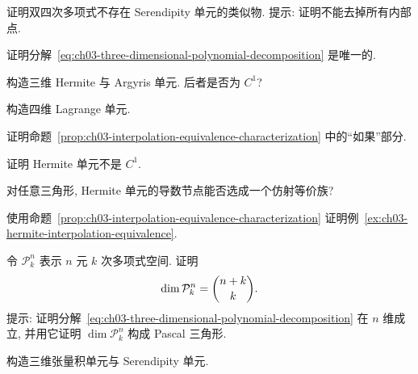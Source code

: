\begin{MBExercise}
\label{exr:ch03-22}
证明双四次多项式不存在 Serendipity 单元的类似物. 提示: 证明不能去掉所有内部点.
\end{MBExercise}

\begin{MBExercise}
\label{exr:ch03-23}
证明分解~\eqref{eq:ch03-three-dimensional-polynomial-decomposition} 是唯一的.
\end{MBExercise}

\begin{MBExercise}
\label{exr:ch03-24}
构造三维 Hermite 与 Argyris 单元. 后者是否为 $C^1$?
\end{MBExercise}

\begin{MBExercise}
\label{exr:ch03-25}
构造四维 Lagrange 单元.
\end{MBExercise}

\begin{MBExercise}
\label{exr:ch03-26}
证明命题~\ref{prop:ch03-interpolation-equivalence-characterization} 中的``如果''部分.
\end{MBExercise}

\begin{MBExercise}
\label{exr:ch03-27}
证明 Hermite 单元不是 $C^1$.
\end{MBExercise}

\begin{MBExercise}
\label{exr:ch03-28}
对任意三角形, Hermite 单元的导数节点能否选成一个仿射等价族?
\end{MBExercise}

\begin{MBExercise}
\label{exr:ch03-29}
使用命题~\ref{prop:ch03-interpolation-equivalence-characterization} 证明例~\ref{ex:ch03-hermite-interpolation-equivalence}.
\end{MBExercise}

\begin{MBExercise}
\label{exr:ch03-30}
令 $\mathcal P_k^n$ 表示 $n$ 元 $k$ 次多项式空间. 证明
\[
\MathBookFormulaID{formula-ch03-exercise-30-polynomial-dimension}
\dim\mathcal P_k^n=\binom{n+k}{k}.
\]
提示: 证明分解~\eqref{eq:ch03-three-dimensional-polynomial-decomposition} 在 $n$ 维成立, 并用它证明 $\dim\mathcal P_k^n$ 构成 Pascal 三角形.
\end{MBExercise}

\begin{MBExercise}
\label{exr:ch03-31}
构造三维张量积单元与 Serendipity 单元.
\end{MBExercise}

